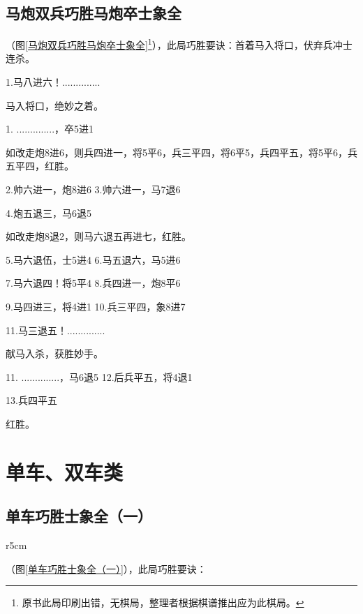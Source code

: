 \documentclass[UTF8]{ctexbook}
\newcommand{\rc}[2]{\piece{#1}{#2}{r}} \newcommand{\bc}[2]{\piece{#1}{#2}{R}}
\newcommand{\rj}[2]{\piece{#1}{#2}{k}} \newcommand{\bj}[2]{\piece{#1}{#2}{K}}
\begin{document}
\subsection{马炮双兵巧胜马炮卒士象全}
（图\ref{马炮双兵巧胜马炮卒士象全}\footnote{原书此局印刷出错，无棋局，整理者根据棋谱推出应为此棋局。}），此局巧胜要诀：首着马入将口，伏弃兵冲士连杀。

1.马八进六！..............

马入将口，绝妙之着。

1. ..............，卒5进1

如改走炮8进6，则兵四进一，将5平6，兵三平四，将6平5，兵四平五，将5平6，兵五平四，红胜。

2.帅六进一，炮8进6 \qquad 3.帅六进一，马7退6

4.炮五退三，马6退5

如改走炮8退2，则马六退五再进七，红胜。

5.马六退伍，士5进4 \qquad 6.马五退六，马5进6

7.马六退四！将5平4 \qquad 8.兵四进一，炮8平6

9.马四进三，将4进1 \qquad 10.兵三平四，象8进7

11.马三退五！..............

献马入杀，获胜妙手。

11. ..............，马6退5 \qquad 12.后兵平五，将4退1

13.兵四平五

红胜。

\section{单车、双车类}
\subsection{单车巧胜士象全（一）}
\begin{wrapfigure}{r}{5cm}
\centering
\vspace{-1.5cm}
\smallboard
\begin{position}
\rj{d}{1} \rc{h}{9}

\bj{d}{9}    
\end{position}
\caption{}\label{单车巧胜士象全（一）} 
\end{wrapfigure}
（图\ref{单车巧胜士象全（一）}），此局巧胜要诀：
\end{document}
